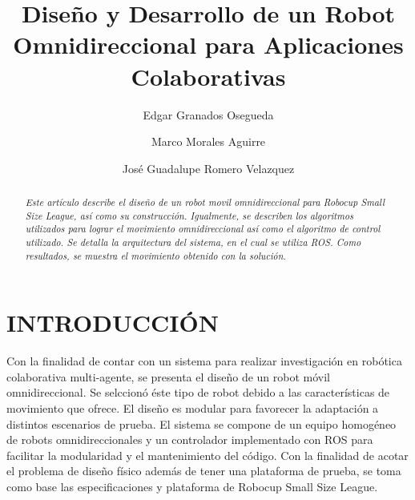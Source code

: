 \documentclass[twocolumn,10pt]{amrob}
\title{Diseño y Desarrollo de un Robot Omnidireccional para Aplicaciones Colaborativas}
\author{Edgar Granados Osegueda
    \affiliation{
	Department of Digital Systems\\
	ITAM\\
	Rio Hondo 1, Ciudad de México, 01080\\
    edgar.granados@itam.mx
    }	
}
\author{Marco Morales Aguirre
       {\tensfb }      
    \affiliation{Department of Digital Systems\\
  ITAM\\
  Rio Hondo 1, Ciudad de México, 01080\\
	marco.morales@itam.mx
    }
}
\author{José Guadalupe Romero Velazquez
       {\tensfb }      
    \affiliation{Department of Digital Systems\\
  ITAM\\
  Rio Hondo 1, Ciudad de México, 01080\\
  jose.romerovelazquez@itam.mx
    }
}
\begin{document}
\graphicspath{ {./Figures/} }
\maketitle    

\begin{abstract}
{\it Este artículo describe el diseño de un robot movil omnidireccional para Robocup Small Size League, así como su construcción. Igualmente, se describen los algoritmos utilizados para lograr el movimiento omnidireccional así como el algoritmo de control utilizado. Se detalla la arquitectura del sistema, en el cual se utiliza ROS. Como resultados, se muestra el movimiento obtenido con la solución. \par
}
\end{abstract}

\section*{INTRODUCCIÓN}

Con la finalidad de contar con un sistema para realizar investigación en robótica colaborativa multi-agente, se presenta el diseño de un robot móvil omnidireccional. Se selccionó éste tipo de robot debido a las características de movimiento que ofrece. El diseño es modular para favorecer la adaptación a distintos escenarios de prueba. El sistema se compone de un equipo homogéneo de robots omnidireccionales y un controlador implementado con ROS para facilitar la modularidad y el mantenimiento del código. Con la finalidad de acotar el problema de diseño físico además de tener una plataforma de prueba, se toma como base las especificaciones y plataforma de Robocup Small Size League. 

\end{document}

